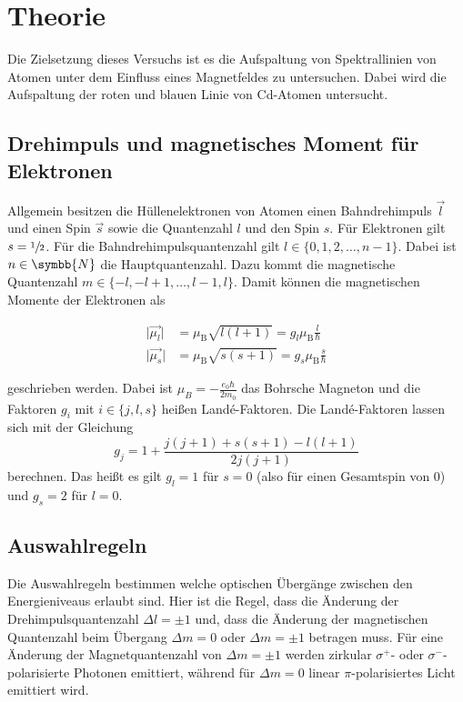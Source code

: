 \section{Theorie}
\label{sec:Theorie}

Die Zielsetzung dieses Versuchs ist es die Aufspaltung von Spektrallinien von Atomen unter dem Einfluss eines Magnetfeldes zu untersuchen. Dabei wird die Aufspaltung der roten und blauen Linie von Cd-Atomen untersucht.

\subsection{Drehimpuls und magnetisches Moment für Elektronen}

Allgemein besitzen die Hüllenelektronen von Atomen einen Bahndrehimpuls $\vec{l}$ und einen Spin $\vec{s}$ sowie die Quantenzahl $l$ und den Spin $s$. Für Elektronen gilt $s = \sfrac{1}{2}$. Für die Bahndrehimpulsquantenzahl gilt $l \in \{0, 1, 2, \ldots , n-1\}$. Dabei ist $n \in \symbb{N}$ die Hauptquantenzahl. Dazu kommt die magnetische Quantenzahl $m \in \{-l, -l+1, \ldots, l-1, l\}$. Damit können die magnetischen Momente der Elektronen als

\begin{align}
    \lvert \vec{\mu_l} \rvert &= \mu_\text{B} \sqrt{l(l+1)} = g_l \mu_\text{B} \frac{l}{\hbar}
    \label{eqn:magn_mom_l} \\
    \lvert \vec{\mu_s} \rvert &= \mu_\text{B} \sqrt{s(s+1)} = g_s \mu_\text{B} \frac{s}{\hbar} 
    \label{eqn:magn_mom_s}
\end{align}

geschrieben werden. Dabei ist $\mu_B = -\frac{e_0 \hbar}{2 m_0}$ das Bohrsche Magneton und die Faktoren $g_{i}$ mit $i \in \{j,l,s\}$ heißen Landé-Faktoren. Die Landé-Faktoren lassen sich mit der Gleichung
\begin{equation}
    g_{j} = 1 + \frac{j(j+1) + s(s+1) - l(l+1)}{2j(j+1)}
    \label{eqn:lande}
\end{equation}
berechnen. Das heißt es gilt $g_l = 1$ für $s = 0$ (also für einen Gesamtspin von 0) und $g_s = 2$ für $l = 0$.

\subsection{Auswahlregeln}

Die Auswahlregeln bestimmen welche optischen Übergänge zwischen den Energieniveaus erlaubt sind. Hier ist die Regel, dass die Änderung der Drehimpulsquantenzahl $\Delta l = \pm 1$ und, dass die Änderung der magnetischen Quantenzahl beim Übergang $\Delta m = 0$ oder $\Delta m = \pm 1$ betragen muss.
Für eine Änderung der Magnetquantenzahl von $\Delta m = \pm 1$ werden zirkular $\sigma^{+}$- oder $\sigma^{-}$-polarisierte Photonen emittiert, während für $\Delta m = 0$ linear $\pi$-polarisiertes Licht emittiert wird.

